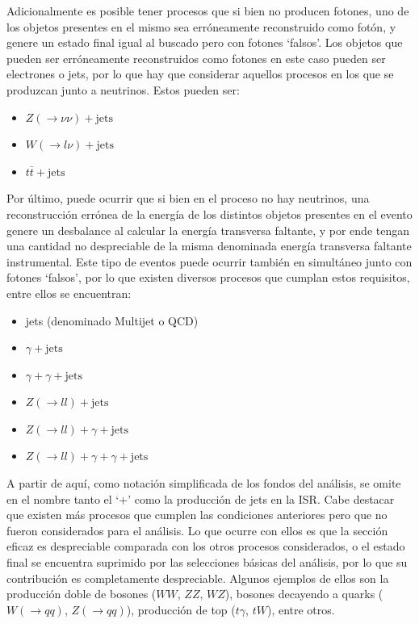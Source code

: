 Adicionalmente es posible tener procesos que si bien no producen fotones, uno de los objetos presentes en el mismo sea erróneamente reconstruido como fotón, y genere un estado final igual al buscado pero con fotones `falsos'. Los objetos que pueden ser erróneamente reconstruidos como fotones en este caso pueden ser electrones o jets, por lo que hay que considerar aquellos procesos en los que se produzcan junto a neutrinos. Estos pueden ser:

\begin{itemize}
  \item $Z(\rightarrow \nu\nu) + \text{jets}$
  \item $W(\rightarrow l\nu) + \text{jets}$
  \item $t\bar{t} + \text{jets}$
\end{itemize}

Por último, puede ocurrir que si bien en el proceso no hay neutrinos, una reconstrucción errónea de la energía de los distintos objetos presentes en el evento genere un desbalance al calcular la energía transversa faltante, y por ende tengan una cantidad no despreciable de la misma denominada energía transversa faltante instrumental. Este tipo de eventos puede ocurrir también en simultáneo junto con fotones `falsos', por lo que existen diversos procesos que cumplan estos requisitos, entre ellos se encuentran:

\begin{itemize}
  \item jets (denominado Multijet o QCD)
  \item $\gamma + \text{jets}$
  \item $\gamma + \gamma + \text{jets}$
  \item $Z(\rightarrow ll) + \text{jets}$
  \item $Z(\rightarrow ll) + \gamma + \text{jets}$
  \item $Z(\rightarrow ll) + \gamma + \gamma + \text{jets}$
\end{itemize}

A partir de aquí, como notación simplificada de los fondos del análisis, se omite en el nombre tanto el `+' como la producción de jets en la ISR. Cabe destacar que existen más procesos que cumplen las condiciones anteriores pero que no fueron considerados para el análisis. Lo que ocurre con ellos es que la sección eficaz es despreciable comparada con los otros procesos considerados, o el estado final se encuentra suprimido por las selecciones básicas del análisis, por lo que su contribución es completamente despreciable. Algunos ejemplos de ellos son la producción doble de bosones  ($WW$, $ZZ$, $WZ$), bosones decayendo a quarks ($W(\rightarrow qq)$, $Z(\rightarrow qq)$), producción de top ($t\gamma$, $tW$), entre otros.


